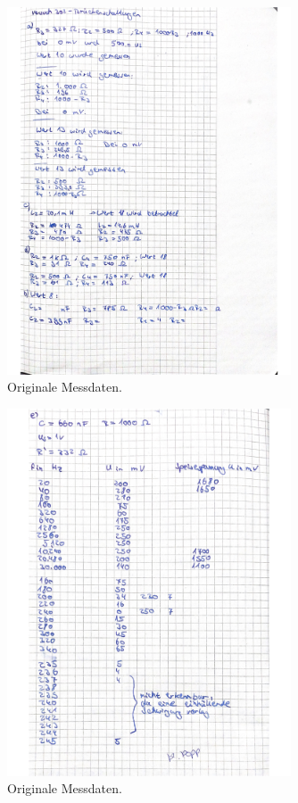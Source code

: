 \begin{figure}
  \centering
  \includegraphics[width=0.75\textwidth]{dateien/daten1.jpg}
  \caption{Originale Messdaten.}
  \label{fig:daten1}
\end{figure}

\begin{figure}
  \centering
  \includegraphics[width=0.75\textwidth]{dateien/daten2.jpg}
  \caption{Originale Messdaten.}
  \label{fig:daten2}
\end{figure}
